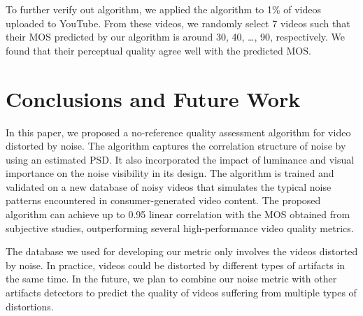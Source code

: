 \documentclass{sig-alternate}
\begin{document}
To further verify out algorithm, we applied the algorithm to 1\% of videos uploaded to YouTube. From these videos, we randomly select 7 videos such that their MOS predicted by our algorithm is around 30, 40, \dots, 90, respectively. We found that their perceptual quality agree well with the predicted MOS. 

\section{Conclusions and Future Work}
\label{sec:conclusion}
In this paper, we proposed a no-reference quality assessment algorithm for video distorted by noise. The algorithm captures the correlation structure of noise by using an estimated PSD. It also incorporated the impact of luminance and visual importance on the noise visibility in its design. The algorithm is trained and validated on a new database of noisy videos that simulates the typical noise patterns encountered in consumer-generated video content. The proposed algorithm can achieve up to 0.95 linear correlation with the MOS obtained from subjective studies, outperforming several high-performance video quality metrics.

The database we used for developing our metric only involves the videos distorted by noise. In practice, videos could be distorted by different types of artifacts in the same time. In the future, we plan to combine our noise metric with other artifacts detectors to predict the quality of videos suffering from multiple types of distortions. 

%

%
%
\end{document}
